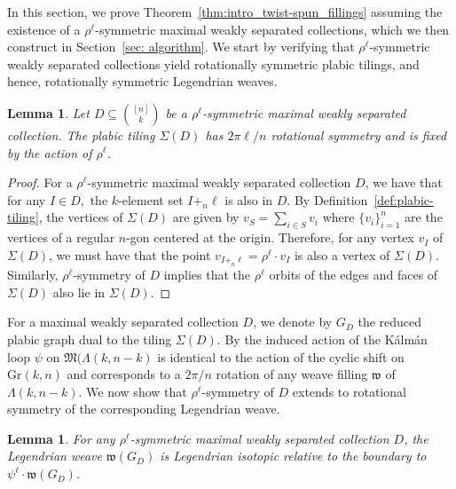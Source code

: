 \documentclass[11pt]{amsart}
\newcommand{\La}{\Lambda}
\newcommand{\Gr}{\text{Gr}}
\newcommand{\w}{\mathfrak{w}}
\newcommand{\FM}{\mathfrak{M}}
\theoremstyle{plain}
\newtheorem{lemma}[theorem]{Lemma}
\theoremstyle{definition}
\begin{document}
In this section, we prove Theorem~\ref{thm:intro_twist-spun_fillings} assuming the existence of a $\rho^\ell$-symmetric maximal weakly separated collections, which we then construct in Section~\ref{sec: algorithm}. We start by verifying that $\rho^\ell$-symmetric weakly separated collections yield rotationally symmetric plabic tilings, and hence, rotationally symmetric Legendrian weaves. 


\begin{lemma}\label{lemma:symmetric_plabic_tiling}
    Let $D\subseteq {[n] \choose k}$ be a $\rho^\ell$-symmetric maximal weakly separated collection. The plabic tiling $\Sigma(D)$ has $2\pi\ell/{n}$ rotational symmetry and is fixed by the action of $\rho^\ell$. 
\end{lemma}

\begin{proof}
For a $\rho^\ell$-symmetric maximal weakly separated collection $D$, we have that for any $I\in D,$ the $k$-element set $I+_n \ell$ is also in $D$. By Definition~\ref{def:plabic-tiling}, the vertices of $\Sigma(D)$ are given by $v_S=\sum_{i\in S} v_i$ where $\{v_i\}_{i=1}^n$ are the vertices of a regular $n$-gon centered at the origin. Therefore, for any vertex $v_I$ of $\Sigma(D)$, we must have that the point $v_{I+_n\ell}=\rho^\ell\cdot v_I$ is also a vertex of $\Sigma(D)$. Similarly, $\rho^\ell$-symmetry of $D$ implies that the $\rho^\ell$ orbits of the edges and faces of $\Sigma(D)$ also lie in $\Sigma(D)$.  

\end{proof}



For a maximal weakly separated collection $D$, we denote by $G_D$ the reduced plabic graph dual to the tiling $\Sigma(D)$. By \cite[Lemma 5.8]{Hughes2024} the induced action of the K\'alm\'an loop $\psi$ on $\FM(\La(k, n-k)$ is identical to the action of the cyclic shift on $\Gr(k, n)$ and corresponds to a $2\pi/n$ rotation of any weave filling $\w$ of $\La(k, n-k)$. We now show that $\rho^\ell$-symmetry of $D$ extends to rotational symmetry of the corresponding Legendrian weave.


\begin{lemma}\label{lemma: symmetric_weave}
For any $\rho^\ell$-symmetric maximal weakly separated collection $D$, the Legendrian weave $\w(G_D)$ is Legendrian isotopic relative to the boundary to $\psi^\ell\cdot \w(G_D)$. 
\end{lemma}
\end{document}
